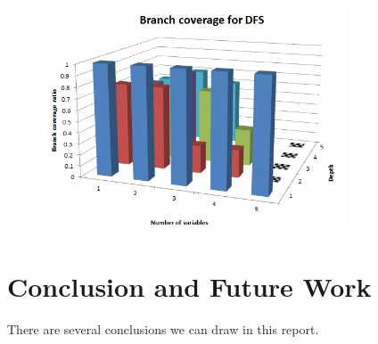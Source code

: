 \documentclass[oribibl]{llncs}
\begin{document}
\begin{figure}[!t]
\centering
\includegraphics[width=9cm]{dfs_branch_coverage}
\caption{}
\label{figure:motivation}
\end{figure}

\section{Conclusion and Future Work}
\label{sctn:Conclusion}

There are several conclusions we can draw in this report.




\end{document}
